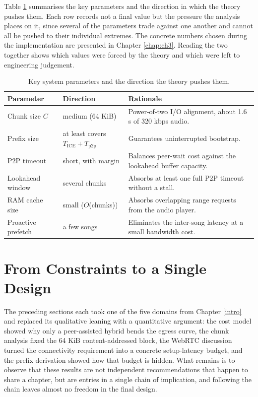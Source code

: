\par Table \ref{tab:param-summary} summarises the key parameters and the direction in which the theory pushes them. Each row records not a final value but the pressure the analysis places on it, since several of the parameters trade against one another and cannot all be pushed to their individual extremes. The concrete numbers chosen during the implementation are presented in Chapter \ref{chap:ch3}. Reading the two together shows which values were forced by the theory and which were left to engineering judgement.

\begin{table}[htbp]
\centering
\begin{tabular}{|p{3.5cm}|p{3cm}|p{7.5cm}|}
\hline
\textbf{Parameter} & \textbf{Direction} & \textbf{Rationale} \\
\hline
Chunk size $C$ & medium (64 KiB) & Power-of-two I/O alignment, about 1.6 s of 320 kbps audio. \\
\hline
Prefix size & at least covers $T_{\text{ICE}} + T_{\text{p2p}}$ & Guarantees uninterrupted bootstrap. \\
\hline
P2P timeout & short, with margin & Balances peer-wait cost against the lookahead buffer capacity. \\
\hline
Lookahead window & several chunks & Absorbs at least one full P2P timeout without a stall. \\
\hline
RAM cache size & small ($O$(chunks)) & Absorbs overlapping range requests from the audio player. \\
\hline
Proactive prefetch & a few songs & Eliminates the inter-song latency at a small bandwidth cost. \\
\hline
\end{tabular}
\caption{Key system parameters and the direction the theory pushes them.}
\label{tab:param-summary}
\end{table}

\section{From Constraints to a Single Design}
\label{sec:synthesis}

\indent \par The preceding sections each took one of the five domains from Chapter \ref{intro} and replaced its qualitative leaning with a quantitative argument: the cost model showed why only a peer-assisted hybrid bends the egress curve, the chunk analysis fixed the 64 KiB content-addressed block, the WebRTC discussion turned the connectivity requirement into a concrete setup-latency budget, and the prefix derivation showed how that budget is hidden. What remains is to observe that these results are not independent recommendations that happen to share a chapter, but are entries in a single chain of implication, and following the chain leaves almost no freedom in the final design.

